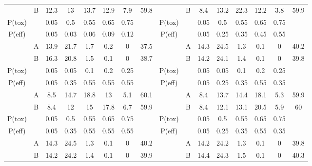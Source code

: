 \begin{table}
{\begin{tabular}[t]{ccccccc>{}c|cccccccc}
			\multirow{-2}{*}{\centering\arraybackslash 3} & B & 12.3 & 13 & 13.7 & 12.9 & 7.9 & 59.8 & \multirow{-2}{*}{\centering\arraybackslash 9} & B & 8.4 & 13.2 & 22.3 & 12.2 & 3.8 & 59.9\\
			\cmidrule{1-16}
			P(tox) &  & 0.05 & 0.5 & 0.55 & 0.65 & 0.75 &  & P(tox) &  & 0.05 & 0.5 & 0.55 & 0.65 & 0.75 \vphantom{1} & \\
			\cmidrule{1-16}
			P(eff) &  & 0.05 & 0.03 & 0.06 & 0.09 & 0.12 &  & P(eff) &  & 0.05 & 0.25 & 0.35 & 0.45 & 0.55 & \\
			\cmidrule{1-16}
			& A & 13.9 & 21.7 & 1.7 & 0.2 & 0 & 37.5 &  & A & 14.3 & 24.5 & 1.3 & 0.1 & 0 & 40.2\\
			
			\multirow{-2}{*}{\centering\arraybackslash 4} & B & 16.3 & 20.8 & 1.5 & 0.1 & 0 & 38.7 & \multirow{-2}{*}{\centering\arraybackslash 10} & B & 14.2 & 24.1 & 1.4 & 0.1 & 0 & 39.8\\
			\cmidrule{1-16}
			P(tox) &  & 0.05 & 0.05 & 0.1 & 0.2 & 0.25 &  & P(tox) &  & 0.05 & 0.05 & 0.1 & 0.2 & 0.25 & \\
			\cmidrule{1-16}
			P(eff) &  & 0.05 & 0.35 & 0.55 & 0.55 & 0.55 &  & P(eff) &  & 0.05 & 0.25 & 0.35 & 0.55 & 0.35 \vphantom{1} & \\
			\cmidrule{1-16}
			& A & 8.5 & 14.7 & 18.8 & 13 & 5.1 & 60.1 &  & A & 8.4 & 13.7 & 14.4 & 18.1 & 5.3 & 59.9\\
			
			\multirow{-2}{*}{\centering\arraybackslash 5} & B & 8.4 & 12 & 15 & 17.8 & 6.7 & 59.9 & \multirow{-2}{*}{\centering\arraybackslash 11} & B & 8.4 & 12.1 & 13.1 & 20.5 & 5.9 & 60\\
			\cmidrule{1-16}
			P(tox) &  & 0.05 & 0.5 & 0.55 & 0.65 & 0.75 &  & P(tox) &  & 0.05 & 0.5 & 0.55 & 0.65 & 0.75 & \\
			\cmidrule{1-16}
			P(eff) &  & 0.05 & 0.35 & 0.55 & 0.55 & 0.55 &  & P(eff) &  & 0.05 & 0.25 & 0.35 & 0.55 & 0.35 & \\
			\cmidrule{1-16}
			& A & 14.3 & 24.5 & 1.3 & 0.1 & 0 & 40.2 &  & A & 14.2 & 24.2 & 1.3 & 0.1 & 0 & 39.8\\
			
			\multirow{-2}{*}{\centering\arraybackslash 6} & B & 14.2 & 24.2 & 1.4 & 0.1 & 0 & 39.9 & \multirow{-2}{*}{\centering\arraybackslash 12} & B & 14.4 & 24.3 & 1.5 & 0.1 & 0 & 40.3\\
			\bottomrule
	\end{tabular}}
\end{table}

